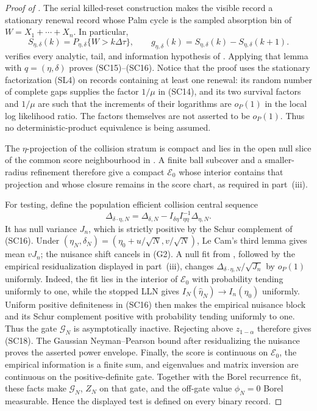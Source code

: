 \begin{proof}[Proof of ]
The serial killed-reset construction makes the visible record a stationary
renewal record whose Palm cycle is the sampled absorption bin of
\(W=X_1+\cdots+X_n\).  In particular,
\[
 S_{\eta,\delta}(k)=P_{\eta,\delta}
 \{W>k\Delta\tau\},\qquad
 g_{\eta,\delta}(k)=S_{\eta,\delta}(k)-S_{\eta,\delta}(k+1).
\tag{G1}
\]
 verifies every analytic,
tail, and information hypothesis of
.  Applying that lemma
with \(q=(\eta,\delta)\) proves \textup{(SC15)}--\textup{(SC16)}.  Notice
that the proof uses the stationary factorization \textup{(SL4)} on records
containing at least one renewal: its
random number of complete gaps supplies the factor \(1/\mu\) in
\textup{(SC14)}, and its two survival factors and \(1/\mu\) are
such that the increments of their logarithms are \(o_P(1)\) in the local
log likelihood ratio.  The factors themselves are not asserted to be
\(o_P(1)\).  Thus no deterministic-product
equivalence is being assumed.

The \(\eta\)-projection of the collision stratum is compact and lies in the
open null slice of the common score neighbourhood in
.  A finite ball subcover and a
smaller-radius refinement therefore give a compact \(\mathcal E_0\) whose
interior contains that projection and whose closure remains in the score
chart, as required in part~\textup{(iii)}.

For testing, define the population efficient collision central sequence
\[
 \Delta_{\delta\cdot\eta,N}
 =\Delta_{\delta,N}
 -I_{\delta\eta}I_{\eta\eta}^{-1}\Delta_{\eta,N}.
\tag{G2}
\]
It has null variance \(J_n\), which is strictly positive by the Schur
complement of \textup{(SC16)}.  Under
\((\eta_N,\delta_N)=(\eta_0+u/\sqrt N,v/\sqrt N)\), Le Cam's third lemma gives
mean \(vJ_n\); the nuisance shift cancels in \textup{(G2)}.  A null fit from
, followed by the
empirical residualization displayed in part~\textup{(iii)}, changes
\(\Delta_{\delta\cdot\eta,N}/\sqrt{J_n}\) by \(o_P(1)\) uniformly.  Indeed,
the fit lies in the interior of \(\mathcal E_0\) with probability tending
uniformly to one, while the stopped LLN gives
\(I_N(\widehat\eta_N)\to I_n(\eta_0)\) uniformly.  Uniform positive
definiteness in \textup{(SC16)} then makes the empirical nuisance block and
its Schur complement positive with probability tending uniformly to one.
Thus the gate \(\mathcal G_N\) is asymptotically inactive.  Rejecting above
\(z_{1-\alpha}\) therefore gives \textup{(SC18)}.  The Gaussian
Neyman--Pearson bound after residualizing the nuisance proves the asserted
power envelope.  Finally, the score is continuous on \(\mathcal E_0\), the
empirical information is a finite sum, and eigenvalues and matrix inversion
are continuous on the positive-definite gate.  Together with the Borel
recurrence fit, these facts make \(\mathcal G_N\), \(Z_N\) on that gate, and
the off-gate value \(\phi_N=0\) Borel measurable.  Hence the displayed test
is defined on every binary record.


\end{proof}
